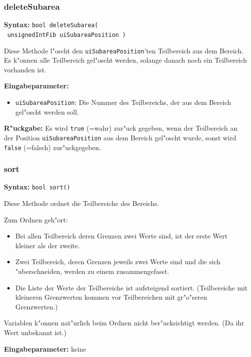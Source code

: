 \subsubsection{deleteSubarea}

\textbf{Syntax:} \verb|bool deleteSubarea(| \\\verb| unsignedIntFib uiSubareaPosition )|

\bigskip\noindent
Diese Methode l"oscht den \verb|uiSubareaPosition|'ten Teilbereich aus dem Bereich. Es k"onnen alle Teilbereich gel"oscht werden, solange danach noch ein Teilbereich vorhanden ist.

\bigskip\noindent
\textbf{Eingabeparameter:}
\begin{itemize}
 \item \verb|uiSubareaPosition|: Die Nummer des Teilbereichs, der aus dem Bereich gel"oscht werden soll.
\end{itemize}

\bigskip\noindent
\textbf{R"uckgabe:} Es wird \verb|true| (=wahr) zur"uck gegeben, wenn der Teilbereich an der Position \verb|uiSubareaPosition| aus dem Bereich gel"oscht wurde, sonst wird \verb|false| (=falsch) zur"uckgegeben.


\subsubsection{sort}

\textbf{Syntax:} \verb|bool sort()|

\bigskip\noindent
Diese Methode ordnet die Teilbereiche des Bereichs.

\bigskip\noindent
Zum Ordnen geh"ort:
\begin{itemize}
 \item Bei allen Teilbereich deren Grenzen zwei Werte sind, ist der erste Wert kleiner als der zweite.
 \item Zwei Teilbereich, deren Grenzen jeweils zwei Werte sind und die sich "uberschneiden, werden zu einem zusammengefasst.
 \item Die Liste der Werte der Teilbereiche ist aufsteigend sortiert. (Teilbereiche mit kleineren Grenzwerten kommen vor Teilbereichen mit gr"o"seren Grenzwerten.)
\end{itemize}

Variablen k"onnen nat"urlich beim Ordnen nicht ber"ucksichtigt werden. (Da ihr Wert unbekannt ist.)

\bigskip\noindent
\textbf{Eingabeparameter:} keine

